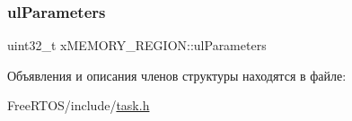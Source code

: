 \mbox{\label{structx_m_e_m_o_r_y___r_e_g_i_o_n_a6ba180553e9a318f23acc5f4664934e3}} 
\subsubsection{\texorpdfstring{ulParameters}{ulParameters}}
{\footnotesize\ttfamily uint32\+\_\+t x\+M\+E\+M\+O\+R\+Y\+\_\+\+R\+E\+G\+I\+O\+N\+::ul\+Parameters}



Объявления и описания членов структуры находятся в файле\+:\begin{DoxyCompactItemize}
\item 
Free\+R\+T\+O\+S/include/\mbox{\hyperlink{task_8h}{task.\+h}}\end{DoxyCompactItemize}
